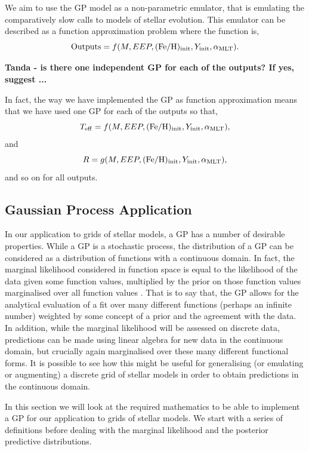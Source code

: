 We aim to use the GP model as a non-parametric emulator, that is emulating the comparatively slow calls to models of stellar evolution.
This emulator can be described as a function approximation problem where the function is,
\begin{equation}\label{gprmodel}
{\rm Outputs} = f(M, EEP, ({\rm Fe/H})_{\rm init}, Y_{\rm init}, \alpha_{\rm MLT}). 
\end{equation}
{\bf Tanda - is there one independent GP for each of the outputs?  If yes,  suggest ... 

In fact, the way we have implemented the GP as function approximation means that we have used one GP for each of the outputs so that,  
\begin{equation}\label{gprmodel1}
{T_{\rm eff}} = f(M, EEP, ({\rm Fe/H})_{\rm init}, Y_{\rm init}, \alpha_{\rm MLT}),
\end{equation}
and 
\begin{equation}\label{gprmodel1}
{R} = g(M, EEP, ({\rm Fe/H})_{\rm init}, Y_{\rm init}, \alpha_{\rm MLT}),
\end{equation}
and so on for all outputs.
}

\subsection{Gaussian Process Application}

In our application to grids of stellar models,  a GP has a number of desirable properties.  While a GP is a stochastic process, the distribution of a GP can be considered as a distribution of functions with a continuous domain.  In fact,  the marginal likelihood considered in function space is equal to the likelihood of the data given some function values,  multiplied by the prior on those function values marginalised over all function values \cite{williams1996gaussian}.  That is to say that, the GP allows for the analytical evaluation of a fit over many different functions (perhaps an infinite number) weighted by some concept of a prior and the agreement with the data.   In addition,  while the marginal likelihood will be assessed on discrete data,  predictions can be made using linear algebra for new data in the continuous domain, but crucially again marginalised over these many different functional forms.  It is possible to see how this might be useful for generalising (or emulating or augmenting) a discrete grid of stellar models in order to obtain predictions in the continuous domain.

In this section we will look at the required mathematics to be able to implement a GP for our application to grids of stellar models.  We start with a series of definitions before dealing with the marginal likelihood and the posterior predictive distributions. 

